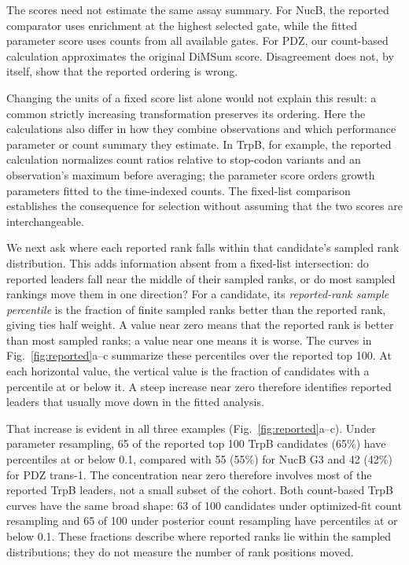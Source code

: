 \documentclass[11pt]{article}
\begin{document}
The scores need not estimate the same assay summary. For NucB, the
reported comparator uses enrichment at the highest selected gate, while
the fitted parameter score uses counts from all available gates. For PDZ,
our count-based calculation approximates the original DiMSum score.
Disagreement does not, by itself, show that the reported ordering is wrong.

Changing the units of a fixed score list alone would not explain this
result: a common strictly increasing transformation preserves its ordering. Here the
calculations also differ in how they combine observations and which
performance parameter or count summary they estimate. In TrpB, for
example, the reported calculation normalizes count ratios relative to
stop-codon variants and an observation's maximum before averaging;
the parameter score orders growth parameters fitted to the time-indexed
counts. The fixed-list comparison establishes the consequence for
selection without assuming that the two scores are interchangeable.

We next ask where each reported rank falls within that candidate's sampled
rank distribution. This adds information absent from a fixed-list
intersection: do reported leaders fall near the middle of their sampled
ranks, or do most sampled rankings move them in one direction? For a
candidate, its \emph{reported-rank sample
percentile} is the fraction of finite sampled ranks better than the
reported rank, giving ties half weight. A value near zero means that the
reported rank is better than most sampled ranks; a value near one means
it is worse. The curves in Fig.~\ref{fig:reported}a--c summarize these
percentiles over the reported top 100. At each horizontal value, the
vertical value is the fraction of candidates with a percentile at or
below it. A steep increase near zero therefore identifies reported
leaders that usually move down in the fitted analysis.

That increase is evident in all three examples
(Fig.~\ref{fig:reported}a--c). Under parameter resampling, 65 of the
reported top 100 TrpB candidates (65\%) have percentiles at or below
0.1, compared with 55 (55\%) for NucB G3 and 42 (42\%) for PDZ trans-1.
The concentration near zero therefore involves most of the reported
TrpB leaders, not a small subset of the cohort.
Both count-based TrpB curves have the same broad shape: 63 of 100
candidates under optimized-fit count resampling and 65 of 100 under
posterior count resampling have percentiles at or below 0.1.
These fractions describe where reported ranks lie within the sampled
distributions; they do not measure the number of rank positions moved.
\end{document}
